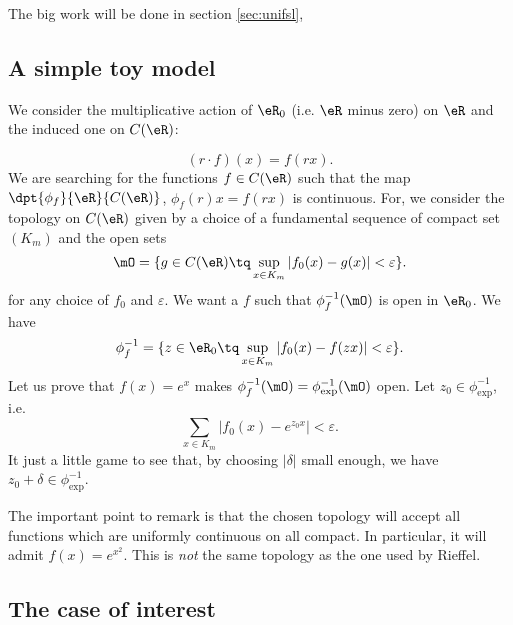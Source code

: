 The big work will be done in section \ref{sec:unifsl},

\subsection{A simple toy model}

We consider the multiplicative action of $\eR_0$ (i.e. $\eR$ minus zero) on $\eR$ and the induced one on $C(\eR)$:

\begin{equation}
(r\cdot f)(x)=f(rx).
\end{equation}
We are searching for the functions $f\in C(\eR)$ such that the map $\dpt{\phi_f}{\eR}{C(\eR)}$, $\phi_f(r)x=f(rx)$ is continuous. For, we consider the topology on $C(\eR)$ given by a choice of a fundamental sequence of compact set $(K_m)$ and the open sets 
\[ 
  \mO=\{ g\in C(\eR)\tq \sup_{x\in K_m}| f_0(x)-g(x) |<\varepsilon \}.
\]
for any choice of $f_0$ and $\varepsilon$. We want a $f$ such that $\phi_f^{-1}(\mO)$ is open in $\eR_0$. We have
\begin{equation}
\phi^{-1}_f=\{ z\in\eR_0\tq \sup_{x\in K_m}| f_0(x)-f(zx) |<\varepsilon \}.
\end{equation}
Let us prove that $f(x)=e^x$ makes $\phi_f^{-1}(\mO)=\phi_{\exp}^{-1}(\mO)$ open. Let $z_0\in \phi^{-1}_{\exp}$, i.e.
\[ 
  \sum_{x\in K_m}| f_0(x)-e^{z_0x} |<\varepsilon.
\]
It just a little game to see that, by choosing $| \delta |$ small enough, we have $z_0+\delta\in\phi_{\exp}^{-1}$.
 
The important point to remark is that the chosen topology will accept all functions which are uniformly continuous on all compact. In particular, it will admit $f(x)=e^{x^2}$. This is \emph{not} the same topology as the one used by Rieffel.

\subsection{The case of interest}

